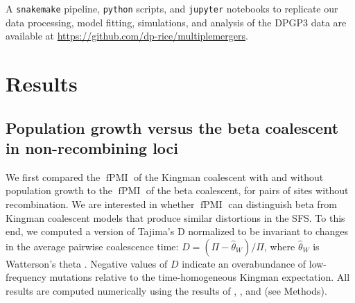 \documentclass[11pt, letterpaper]{article}   	%
\DeclareMathOperator{\fpmi}{fPMI}
\begin{document}
A \texttt{snakemake} pipeline, \texttt{python} scripts, and \texttt{jupyter} notebooks to replicate our data processing, model fitting, simulations, and analysis of the DPGP3 data are available at \url{https://github.com/dp-rice/multiplemergers}.

\section*{Results \label{sec:results}}

\subsection*{Population growth versus the beta coalescent in non-recombining loci}

We first compared the $\fpmi$ of the Kingman coalescent with and without population growth to the $\fpmi$ of the beta coalescent, for pairs of sites without recombination.
We are interested in whether $\fpmi$ can distinguish beta from Kingman coalescent models that produce similar distortions in the SFS.
To this end, we computed a version of Tajima's D \autocite{Tajima1989} normalized to be invariant to changes in the average pairwise coalescence time: $D = (\Pi - \hat{\theta}_W) / \Pi$, where $\hat{\theta}_W$ is Watterson's theta \autocite{Watterson1975}.
Negative values of $D$ indicate an overabundance of low-frequency mutations relative to the time-homogeneous Kingman expectation.
All results are computed numerically using the results of \textcite{Fu1995}, \textcite{ZivkovicWiehe2008}, and \textcite{BirknerEtAl2013} (see Methods).
\end{document}
